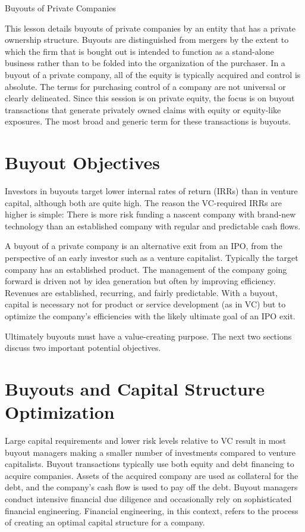 \documentclass[11pt]{article}
\begin{document}
Buyouts of Private Companies

This lesson details buyouts of private companies by an entity that has a private ownership structure. Buyouts are distinguished from mergers by the extent to which the firm that is bought out is intended to function as a stand-alone business rather than to be folded into the organization of the purchaser. In a buyout of a private company, all of the equity is typically acquired and control is absolute. The terms for purchasing control of a company are not universal or clearly delineated. Since this session is on private equity, the focus is on buyout transactions that generate privately owned claims with equity or equity-like exposures. The most broad and generic term for these transactions is buyouts.

\section*{Buyout Objectives}
Investors in buyouts target lower internal rates of return (IRRs) than in venture capital, although both are quite high. The reason the VC-required IRRs are higher is simple: There is more risk funding a nascent company with brand-new technology than an established company with regular and predictable cash flows.

A buyout of a private company is an alternative exit from an IPO, from the perspective of an early investor such as a venture capitalist. Typically the target company has an established product. The management of the company going forward is driven not by idea generation but often by improving efficiency. Revenues are established, recurring, and fairly predictable. With a buyout, capital is necessary not for product or service development (as in VC) but to optimize the company's efficiencies with the likely ultimate goal of an IPO exit.

Ultimately buyouts must have a value-creating purpose. The next two sections discuss two important potential objectives.

\section*{Buyouts and Capital Structure Optimization}
Large capital requirements and lower risk levels relative to VC result in most buyout managers making a smaller number of investments compared to venture capitalists. Buyout transactions typically use both equity and debt financing to acquire companies. Assets of the acquired company are used as collateral for the debt, and the company's cash flow is used to pay off the debt. Buyout managers conduct intensive financial due diligence and occasionally rely on sophisticated financial engineering. Financial engineering, in this context, refers to the process of creating an optimal capital structure for a company.
\end{document}
